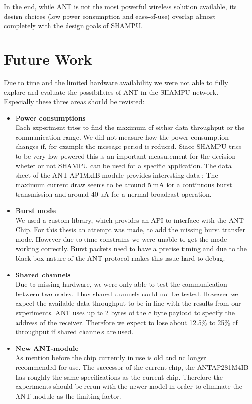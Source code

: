 In the end, while ANT is not the most powerful wireless solution available, its design choices (low power consumption and ease-of-use) overlap almost completely with the design goals of SHAMPU.
\newpage
\section{Future Work}
\label{sec:future}
Due to time and the limited hardware availability we were not able to fully explore and evaluate the possibilities of ANT in the SHAMPU network. Especially these three areas should be revisted:

\begin{itemize}
	\item{\textbf{Power consumptions}} \hfill \\ Each experiment tries to find the maximum of either data throughput or the communication range. We did not measure how the power consumption changes if, for example the message period is reduced. Since SHAMPU tries to be very low-powered this is an important measurement for the decision wheter or not SHAMPU can be used for a specific application. The data sheet of the ANT AP1MxIB module provides interesting data \cite{Networks}: The maximum current draw seems to be around 5 mA for a continuous burst transmission and around 40 µA for a normal broadcast operation.
	
	\item{\textbf{Burst mode}} \hfill \\ We used a custom library, which provides an API to interface with the ANT-Chip. For this thesis an attempt was made, to add the missing burst transfer mode. However due to time constrains we were unable to get the mode working correctly. Burst packets need to have a precise timing and due to the black box nature of the ANT protocol makes this issue hard to debug.
	
	\item{\textbf{Shared channels}} \hfill \\ Due to missing hardware, we were only able to test the communication between two nodes. Thus shared channels could not be tested. However we expect the available data throughput to be in line with the results from our experiments. ANT uses up to 2 bytes of the 8 byte payload to specify the address of the receiver. Therefore we expect to lose about 12.5\% to 25\% of throughput if shared channels are used.
	
	\item{\textbf{New ANT-module}} \hfill \\ As mention before the chip currently in use is old and no longer recommended for use. The successor of the current chip, the ANTAP281M4IB has roughly the same specifications as the current chip. Therefore the experiments should be rerun with the newer model in order to eliminate the ANT-module as the limiting factor.
\end{itemize}